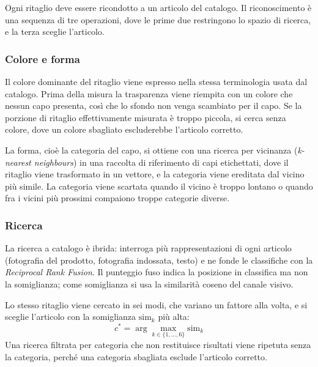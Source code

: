Ogni ritaglio deve essere ricondotto a un articolo del catalogo. Il riconoscimento è una sequenza di tre operazioni, dove le prime due restringono lo spazio di ricerca, e la terza sceglie l'articolo.

\subsubsection{Colore e forma}

Il colore dominante del ritaglio viene espresso nella stessa terminologia usata dal catalogo. Prima della misura la trasparenza viene riempita con un colore che nessun capo presenta, così che lo sfondo non venga
scambiato per il capo. Se la porzione di ritaglio effettivamente misurata è troppo piccola, si cerca senza colore, dove un colore sbagliato escluderebbe l'articolo corretto.

\noindent
La forma, cioè la categoria del capo, si ottiene con una ricerca per vicinanza (\emph{k-nearest neighbours}) in una raccolta di riferimento di capi etichettati, dove il ritaglio
viene trasformato in un vettore, e la categoria viene ereditata dal vicino più simile.
La categoria viene scartata quando il vicino è troppo lontano o quando fra i vicini più prossimi compaiono troppe categorie diverse.

\subsubsection{Ricerca}

La ricerca a catalogo è ibrida: interroga più rappresentazioni di ogni articolo (fotografia del prodotto, fotografia indossata, testo) e ne fonde le classifiche con la \emph{Reciprocal Rank Fusion}. Il punteggio fuso indica la posizione in classifica ma non la somiglianza; come somiglianza si usa la similarità coseno
del canale visivo.

\noindent
Lo stesso ritaglio viene cercato in sei modi, che variano un fattore alla volta, e si sceglie l'articolo con la somiglianza $\mathrm{sim}_k$ più alta:
\begin{equation}
  c^{*} = \arg\max_{k \in \{1, \dots, 6\}} \mathrm{sim}_{k}
\end{equation}
Una ricerca filtrata per categoria che non restituisce risultati viene ripetuta senza la categoria, perché una categoria sbagliata esclude l'articolo corretto.

